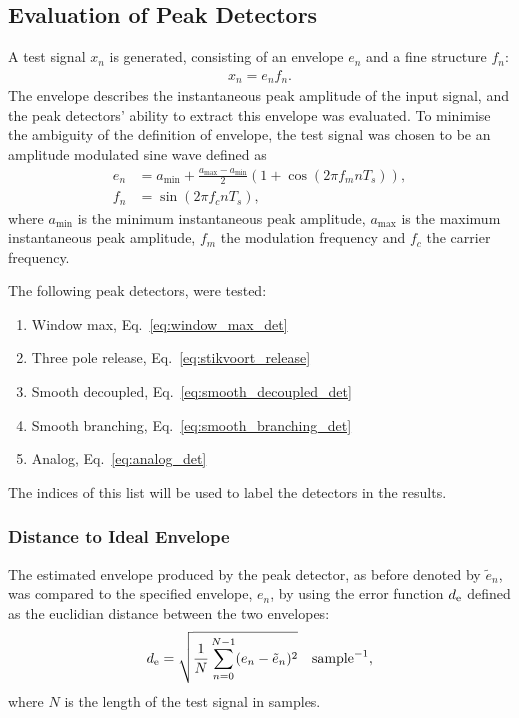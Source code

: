 \documentclass[../main2.tex]{subfiles}
\begin{document}
\subsection{Evaluation of Peak Detectors}\label{method_peak_detectors}
A test signal $x_n$ is generated, consisting of an envelope $e_n$ and a fine structure $f_n$:
\begin{align}
x_n = e_n f_n.
\end{align}
The envelope describes the instantaneous peak amplitude of the input signal, and the peak detectors' ability to extract this envelope was evaluated. To minimise the ambiguity of the definition of envelope, the test signal was chosen to be an amplitude modulated sine wave defined as
\begin{equation}
\begin{split}
	e_n &= a_\text{min} + \frac{a_\text{max}- a_\text{min}}{2} \left(1 + \cos(2 \pi f_m n T_s) \right), \\
	f_n &= \sin(2 \pi f_c n T_s),
\end{split} \label{eq:test_signal}
\end{equation}
where $a_\text{min}$ is the minimum instantaneous peak amplitude, $a_\text{max}$ is the maximum instantaneous peak amplitude, $f_m$ the modulation frequency and $f_c$ the carrier frequency.

The following peak detectors, were tested:
\begin{enumerate}
\item Window max, Eq.~\eqref{eq:window_max_det}
\item Three pole release, Eq.~\eqref{eq:stikvoort_release}
\item Smooth decoupled, Eq.~\eqref{eq:smooth_decoupled_det}
\item Smooth branching, Eq.~\eqref{eq:smooth_branching_det}
\item Analog,  Eq.~\eqref{eq:analog_det}
\end{enumerate}
The indices of this list will be used to label the detectors in the results.

\subsubsection{Distance to Ideal Envelope}
The estimated envelope produced by the peak detector, as before denoted by $\tilde{e}_n$, was compared to the specified envelope, $e_n$, by using the error function $d_\text{e}$ defined as the euclidian distance between the two envelopes:
\begin{equation}
d_\text{e} = \sqrt{ \frac{1}{N}\sum_{n = 0}^{N-1} (e_n - \tilde{e}_n)^2 } \quad \text{sample}^{-1},
\end{equation}
where $N$ is the length of the test signal in samples. 
\end{document}
